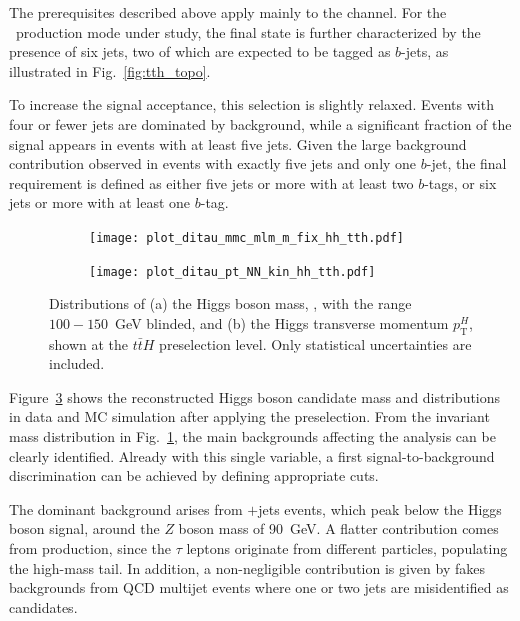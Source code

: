 The prerequisites described above apply mainly to the \tauhadhad channel. 
For the \ttH\ production mode under study, the final state is further characterized by the presence of six jets, two of which are expected to be tagged as $b$-jets, as illustrated in Fig.~\ref{fig:tth_topo}. 

To increase the signal acceptance, this selection is slightly relaxed. Events with four or fewer jets are dominated by background, while a significant fraction of the signal appears in events with at least five jets. 
Given the large background contribution observed in events with exactly five jets and only one $b$-jet, the final requirement is defined as either five jets or more with at least two $b$-tags, or six jets or more with at least one $b$-tag.

\begin{figure}[htbp]
    \centering
    \begin{subfigure}[b]{0.48\textwidth}
        \centering
        \texttt{[image: plot\_ditau\_mmc\_mlm\_m\_fix\_hh\_tth.pdf]}
        \caption{}
        \label{reconstructed_preselection_a}
    \end{subfigure}
    \hfill
    \begin{subfigure}[b]{0.48\textwidth}
        \centering
        \texttt{[image: plot\_ditau\_pt\_NN\_kin\_hh\_tth.pdf]}
        \caption{}
        \label{reconstructed_preselection_b}
    \end{subfigure}
    \caption{Distributions of (a) the Higgs boson mass, \mtt, with the range $100-150$~GeV blinded, and (b) the Higgs transverse momentum $p_{\text{T}}^H$, shown at the $t\bar{t}H$ preselection level. Only statistical uncertainties are included.}
    \label{reconstructed_preselection}
\end{figure}


Figure~\ref{reconstructed_preselection} shows the reconstructed Higgs boson candidate mass and \pth distributions in data and MC simulation after applying the preselection. 
From the invariant mass distribution in Fig.~\ref{reconstructed_preselection_a}, the main backgrounds affecting the analysis can be clearly identified. 
Already with this single variable, a first signal-to-background discrimination can be achieved by defining appropriate cuts. 

The dominant background arises from \ztautau$+$jets events, which peak below the Higgs boson signal, around the $Z$ boson mass of 90~GeV. 
A flatter contribution comes from \ttbar production, since the $\tau$ leptons originate from different particles, populating the high-mass tail. In addition, a non-negligible contribution is given by fakes backgrounds from QCD multijet events where one or two jets are misidentified as \tauhad candidates. 

